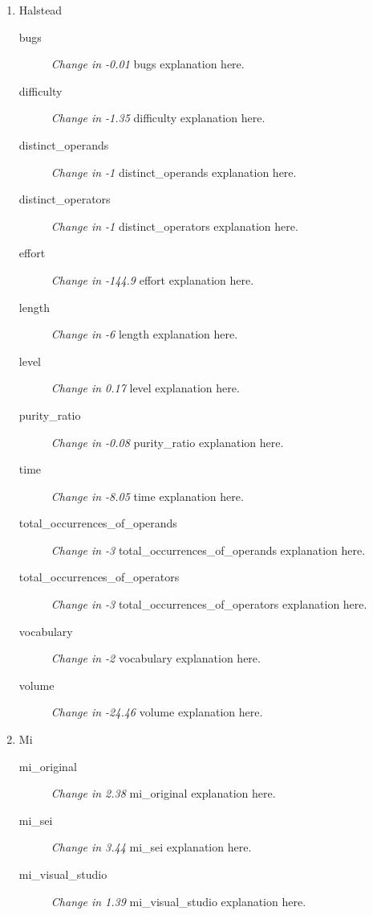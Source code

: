 \begin{enumerate}
      \item Halstead
            \begin{description}
                  \item [bugs] \textit{Change in -0.01} bugs explanation here.
                  \item [difficulty] \textit{Change in -1.35} difficulty explanation here.
                  \item [distinct\_operands] \textit{Change in -1} distinct\_operands explanation here.
                  \item [distinct\_operators] \textit{Change in -1} distinct\_operators explanation here.
                  \item [effort] \textit{Change in -144.9} effort explanation here.
                  \item [length] \textit{Change in -6} length explanation here.
                  \item [level] \textit{Change in 0.17} level explanation here.
                  \item [purity\_ratio] \textit{Change in -0.08} purity\_ratio explanation here.
                  \item [time] \textit{Change in -8.05} time explanation here.
                  \item [total\_occurrences\_of\_operands] \textit{Change in -3} total\_occurrences\_of\_operands explanation here.
                  \item [total\_occurrences\_of\_operators] \textit{Change in -3} total\_occurrences\_of\_operators explanation here.
                  \item [vocabulary] \textit{Change in -2} vocabulary explanation here.
                  \item [volume] \textit{Change in -24.46} volume explanation here.
            \end{description}
      \item Mi
            \begin{description}
                  \item [mi\_original] \textit{Change in 2.38} mi\_original explanation here.
                  \item [mi\_sei] \textit{Change in 3.44} mi\_sei explanation here.
                  \item [mi\_visual\_studio] \textit{Change in 1.39} mi\_visual\_studio explanation here.
            \end{description}

\end{enumerate}
